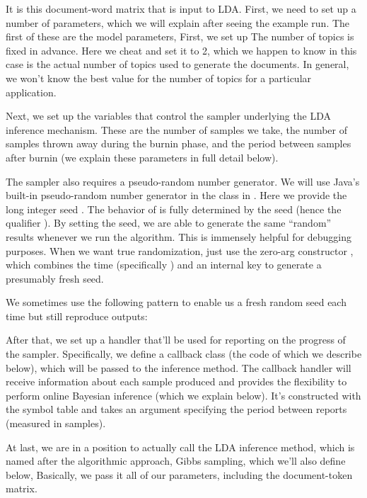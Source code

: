It is this document-word matrix that is input to LDA.  First,
we need to set up a number of parameters, which we will explain
after seeing the example run.  The first of these are the model
parameters,
%
%
First, we set up 
The number of topics is fixed in advance.  Here we cheat and set
it to 2, which we happen to know in this case is the actual number
of topics used to generate the documents.  In general, we won't know
the best value for the number of topics for a particular application.

Next, we set up the variables that control the sampler underlying
the LDA inference mechanism.
%
%
These are the number of samples we take, the number of samples thrown
away during the burnin phase, and the period between samples after
burnin (we explain these parameters in full detail below).  

The sampler also requires a pseudo-random number generator.  We will
use Java's built-in pseudo-random number generator in the class
 in .  Here we provide the long integer
seed .  The behavior of  is fully determined by
the seed (hence the qualifier ).  By setting
the seed, we are able to generate the same ``random'' results whenever
we run the algorithm.  This is immensely helpful for debugging
purposes.  When we want true randomization, just use the zero-arg
constructor , which combines the time (specifically
) and an internal key to generate a presumably
fresh seed.  

We sometimes use the following pattern to enable us a fresh random
seed each time but still reproduce outputs:
%

After that, we set up a handler that'll be used for reporting on the
progress of the sampler.  Specifically, we define a callback class
 (the code of which we describe
below), which will be passed to the inference method.
%
%
The callback handler will receive information about each sample
produced and provides the flexibility to perform online Bayesian
inference (which we explain below).  It's constructed with the
symbol table and takes an argument specifying the period between
reports (measured in samples).

At last, we are in a position to actually call the LDA inference
method, which is named after the algorithmic approach, Gibbs
sampling, which we'll also define below,
%
%
Basically, we pass it all of our parameters, including the
document-token matrix.

